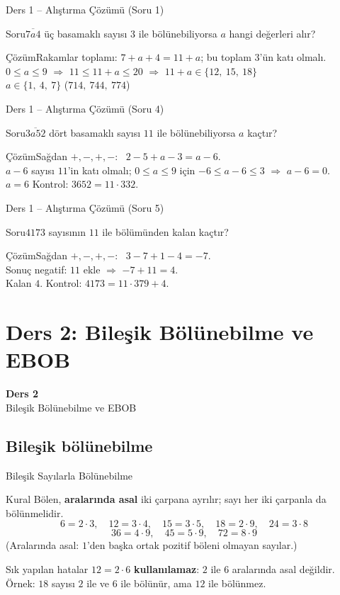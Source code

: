 \documentclass[aspectratio=169,11pt]{beamer}
\newcommand{\soru}[3]{%
\begin{frame}{#1}
  \begin{block}{Soru}\large #2\end{block}
  \pause
  \begin{exampleblock}{Çözüm}\large #3\end{exampleblock}
\end{frame}}
\newcommand{\ab}[1]{\overline{#1}}
\begin{document}
\soru{Ders 1 -- Alıştırma Çözümü (Soru 1)}
{\(\ab{7a4}\) üç basamaklı sayısı \(3\) ile bölünebiliyorsa \(a\) hangi değerleri alır?}
{Rakamlar toplamı: \(7+a+4=11+a\); bu toplam \(3\)'ün katı olmalı.\\[3pt]
\(0\le a\le 9\) \(\Rightarrow\) \(11\le 11+a\le 20\) \(\Rightarrow\) \(11+a\in\{12,\ 15,\ 18\}\)\\[3pt]
\(a\in\{1,\ 4,\ 7\}\) \quad (\(714,\ 744,\ 774\))}

\soru{Ders 1 -- Alıştırma Çözümü (Soru 4)}
{\(\ab{3a52}\) dört basamaklı sayısı \(11\) ile bölünebiliyorsa \(a\) kaçtır?}
{Sağdan \(+,-,+,-\): \ \(2-5+a-3=a-6\).\\[3pt]
\(a-6\) sayısı \(11\)'in katı olmalı; \(0\le a\le 9\) için \(-6\le a-6\le 3\) \(\Rightarrow\) \(a-6=0\).\\[3pt]
\(a=6\) \quad Kontrol: \(3652=11\cdot 332\).}

\soru{Ders 1 -- Alıştırma Çözümü (Soru 5)}
{\(4173\) sayısının \(11\) ile bölümünden kalan kaçtır?}
{Sağdan \(+,-,+,-\): \ \(3-7+1-4=-7\).\\[3pt]
Sonuç negatif: \(11\) ekle \(\Rightarrow\) \(-7+11=4\).\\[3pt]
Kalan \(4\). \quad Kontrol: \(4173=11\cdot 379+4\).}

\section{Ders 2: Bileşik Bölünebilme ve EBOB}
\begin{frame}
\centering\Large\color{anamavi}\textbf{Ders 2}\\[6pt]\normalsize Bileşik Bölünebilme ve EBOB
\end{frame}

\subsection{Bileşik bölünebilme}
\begin{frame}{Bileşik Sayılarla Bölünebilme}
\begin{block}{Kural}
Bölen, \textbf{aralarında asal} iki çarpana ayrılır; sayı her iki çarpanla da bölünmelidir.
\[6=2\cdot 3,\quad 12=3\cdot 4,\quad 15=3\cdot 5,\quad 18=2\cdot 9,\quad 24=3\cdot 8\]
\[36=4\cdot 9,\quad 45=5\cdot 9,\quad 72=8\cdot 9\]
(Aralarında asal: \(1\)'den başka ortak pozitif böleni olmayan sayılar.)
\end{block}
\begin{alertblock}{Sık yapılan hatalar}
\(12=2\cdot 6\) \textbf{kullanılamaz}: \(2\) ile \(6\) aralarında asal değildir.\\
Örnek: \(18\) sayısı \(2\) ile ve \(6\) ile bölünür, ama \(12\) ile bölünmez.
\end{alertblock}
\end{frame}
\end{document}
